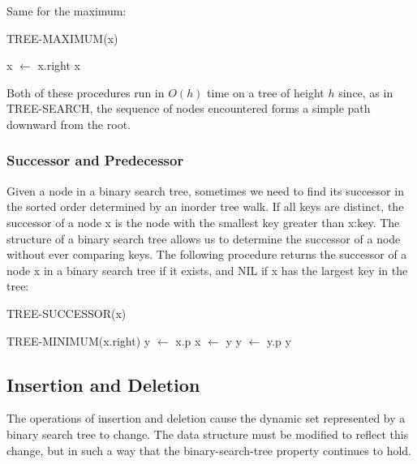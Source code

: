Same for the maximum:

\begin{algorithm}[H]
    \caption{TREE-MAXIMUM(x)}
    \begin{algorithmic}[1]
            \State x $\gets$ x.right
        \EndWhile
        \State \Return x
    \end{algorithmic}
\end{algorithm}

Both of these procedures run in $O(h)$ time on a tree of height $h$ since, as in TREE-SEARCH, the sequence of nodes encountered forms a simple path downward from the root.

\subsubsection*{Successor and Predecessor}

Given a node in a binary search tree, sometimes we need to find its successor in the sorted order determined by an inorder tree walk. If all keys are distinct, the
successor of a node x is the node with the smallest key greater than x:key. The structure of a binary search tree allows us to determine the successor of a node
without ever comparing keys. The following procedure returns the successor of a node x in a binary search tree if it exists, and NIL if x has the largest key in the tree:

\begin{algorithm}[H]
    \caption{TREE-SUCCESSOR(x)}
    \begin{algorithmic}[1]
            \State \Return TREE-MINIMUM(x.right)
        \EndIf
        \State y $\gets$ x.p
            \State x $\gets$ y
            \State y $\gets$ y.p
        \EndWhile
        \State \Return y
    \end{algorithmic}
\end{algorithm}

\subsection{Insertion and Deletion}

The operations of insertion and deletion cause the dynamic set represented by a
binary search tree to change. The data structure must be modified to reflect this
change, but in such a way that the binary-search-tree property continues to hold.

